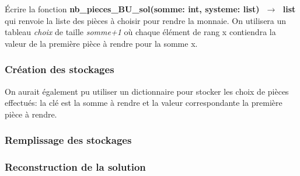 \documentclass[svgnames,11pt]{beamer}
\begin{document}
\begin{frame}
    \frametitle{}

    \begin{activite}
        Écrire la fonction \textbf{nb\_pieces\_BU\_sol(somme: int, systeme: list) $\;\rightarrow\;$ list} qui renvoie la liste des pièces à choisir pour rendre la monnaie. On utilisera un tableau \emph{choix} de taille \emph{somme+1} où chaque élément de rang x contiendra la valeur de la première pièce à rendre pour la somme x.
        \end{activite}

\end{frame}
\begin{frame}
    \frametitle{Création des stockages}

    
\begin{aretenir}[Remarque]
On aurait également pu utiliser un dictionnaire pour stocker les choix de pièces effectués: la clé est la somme à rendre et la valeur correspondante la première pièce à rendre.
\end{aretenir}
\end{frame}
\begin{frame}
    \frametitle{Remplissage des stockages}

    

\end{frame}
\begin{frame}
    \frametitle{Reconstruction de la solution}

    

\end{frame}
\end{document}
